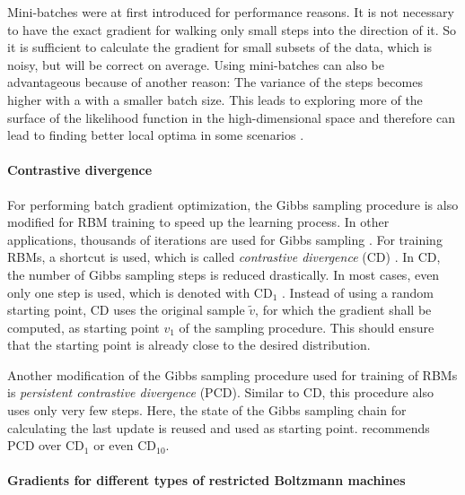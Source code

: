 \documentclass[12pt]{article}
\begin{document}

Mini-batches were at first introduced for performance reasons.
It is not necessary to have the exact gradient for walking only small steps into the direction of it.
So it is sufficient to calculate the gradient for small subsets of the data, which is noisy, but will be correct on average.
Using mini-batches can also be advantageous because of another reason: The variance of the steps becomes higher with a with a smaller batch size. This leads to exploring more of the surface of the likelihood function in the high-dimensional space and therefore can lead to finding better local optima in some scenarios \citep{bengio2012practical}.

\paragraph{Contrastive divergence}

For performing batch gradient optimization, the Gibbs sampling procedure is also modified for RBM training to speed up the learning process.
In other applications, thousands of iterations are used for Gibbs sampling  \citep{gibbssamplingorig}. For training RBMs, a shortcut is used, which is called {\em contrastive divergence} (CD) \citep{cdorig, perpinan_contrastive_2005}.
In CD, the number of Gibbs sampling steps is reduced drastically. In most cases, even only one step is used, which is denoted with $\text{CD}_1$ \citep{hinton_practical_2012}.
Instead of using a random starting point, CD uses the original sample $\widetilde{v}$, for which the gradient shall be computed, as starting point $v_1$ of the sampling procedure. This should ensure that the starting point is already close to the desired distribution.

Another modification of the Gibbs sampling procedure used for training of RBMs is {\em persistent contrastive divergence} (PCD).
Similar to CD, this procedure also uses only very few steps. Here, the state of the Gibbs sampling chain for calculating the last update is reused and used as starting point. \cite{hinton_practical_2012} recommends PCD over $\text{CD}_1$ or even $\text{CD}_{10}$.

\paragraph{Gradients for different types of restricted Boltzmann machines}\label{rbmgradients}
\end{document}
